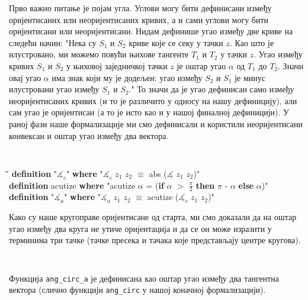 Прво важно питање је појам угла. Углови могу бити дефинисани између
оријентисаних или неоријентисаних кривих, а и сами углови могу бити
оријентисани или неоријентисани. Нидам дефинише угао између две криве
на следећи начин: "Нека су $S_1$ и $S_2$ криве које се секу у тачки
$z$. Као што је илустровано, ми можемо повући њихове тангенте $T_1$ и
$T_2$ у тачки $z$. Угао између кривих $S_1$ и $S_2$ у њиховој
заједничкој тачки $z$ је оштар угао $\alpha$ од $T_1$ до $T_2$. Значи
овај угао $\alpha$ има знак који му је додељен: угао између $S_2$ и
$S_1$ је минус илустровани угао између $S_1$ и $S_2$."  То значи да је
угао дефинисан само између неоријентисаних кривих (и то је различито у
односу на нашу дефиницију), али сам угао је оријентисан (а то је исто
као и у нашој финалној дефиницији).  У раној фази наше формализације
ми смо дефинисали и користили неоријентисани конвексан и оштар угао
између два вектора.

{\tt
  \begin{tabbing}
    \hspace{5mm}\=\hspace{5mm}\=\hspace{5mm}\=\hspace{5mm}\=\hspace{5mm}\=\kill
\textbf{definition} "$\measuredangle_c$" \textbf{where} "$\measuredangle_c$ $z_1$ $z_2$ $\equiv$ abs ($\measuredangle$ $z_1$ $z_2$)"\\
\textbf{definition} acutize \textbf{where} "acutize $\alpha$ = (\textbf{if} $\alpha$ $>$ $\frac{\pi}{2}$ \textbf{then} $\pi$ - $\alpha$ \textbf{else} $\alpha$)"\\
\textbf{definition} "$\measuredangle_a$" \textbf{where} "$\measuredangle_a$ $z_1$ $z_2$ $\equiv$ acutize ($\measuredangle_c$ $z_1$ $z_2$)"
  \end{tabbing}
}

Како су наше кругоправе оријентисане од старта, ми смо доказали да на
оштар угао између два круга не утиче оријентација и да се он може
изразити у терминима три тачке (тачке пресека и тачака које
представљају центре кругова).

{\tt
  \begin{tabbing}
    \hspace{5mm}\=\hspace{5mm}\=\hspace{5mm}\=\hspace{5mm}\=\hspace{5mm}\=\kill
\textbf{lemma} "}\=$\lbrakk z \neq \mu_1$;$z \neq \mu_2\rbrakk$ $\Longrightarrow$\\
\> ang\_circ\_a $z$ $\mu_1$ $\mu_2$ $p_1$ $p_2$ = $\measuredangle_a\ (z - \mu_1)\ (z - \mu_2)$"}
\end{tabbing}
}
\noindent Функција {\tt ang\_circ\_a} је дефинисана као оштар угао
између два тангентна вектора (слично функцији {\tt ang\_circ} у нашој
коначној формализацији).

